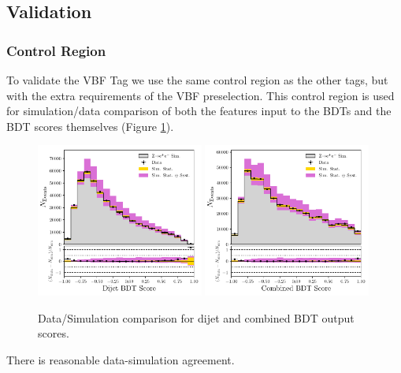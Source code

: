 \subsection{Validation}
\subsubsection{\Zee Control Region}
To validate the VBF Tag we use the same \Zee control region as the other tags, but with the extra requirements of the VBF preselection. 
This control region is used for simulation/data comparison of both the features input to the BDTs and the BDT scores themselves (Figure \ref{fig:event_categorisation:zee_bdt_score_validation}). 
\begin{figure}[h!]
    \begin{center}
        \includegraphics[width=0.49\textwidth]{figures/event_selection/dijet_BDT_zee_LPS.pdf}
        \includegraphics[width=0.49\textwidth]{figures/event_selection/combined_BDT_zee_LPS.pdf}
    \end{center}
    \caption{Data/Simulation comparison for dijet and combined BDT output scores.}
    \label{fig:event_categorisation:zee_bdt_score_validation}
\end{figure}
There is reasonable data-simulation agreement. 


